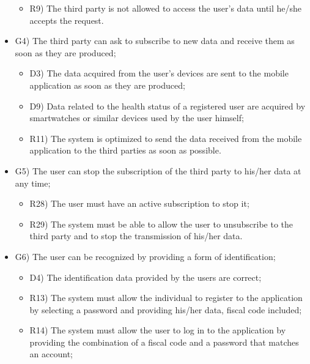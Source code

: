 \documentclass{article}
\begin{document}
\begin{legal}
\begin{legal}
\begin{legal}
\begin{itemize}
{\begin{itemize}
					\item R9) The third party is not allowed to access the user’s data until he/she accepts the request.\\
					\end{itemize}
				}
				\item G4) The third party can ask to subscribe to new data and receive them as soon as they are produced;\\
				{\normalfont
					\begin{itemize}
					\item D3) The data acquired from the user’s devices are sent to the mobile application as soon as they are produced;\\
	 				\item D9) Data related to the health status of a registered user are acquired by smartwatches or similar devices used by the user himself;\\
					\item R11) The system is optimized to send the data received from the mobile application to the third parties as soon as possible.\\
					\end{itemize}
				}
				\item G5) The user can stop the subscription of the third party to his/her data at any time;\\
				{\normalfont
					\begin{itemize}
					\item R28) The user must have an active subscription to stop it;\\
	 				\item R29) The system must be able to allow the user to unsubscribe to the third party and to stop the transmission of his/her data.\\
					\end{itemize}
				}
				\item G6) The user can be recognized by providing a form of identification;\\
				{\normalfont
					\begin{itemize}
					\item D4) The identification data provided by the users are correct;\\
					\item R13) The system must allow the individual to register to the application by selecting a password and providing his/her data, fiscal code included;\\
					\item R14) The system must allow the user to log in to the application by providing the combination of a fiscal code and a password that matches an account;\\

\end{itemize}}
\end{itemize}
\end{legal}
\end{legal}
\end{legal}
\end{document}
